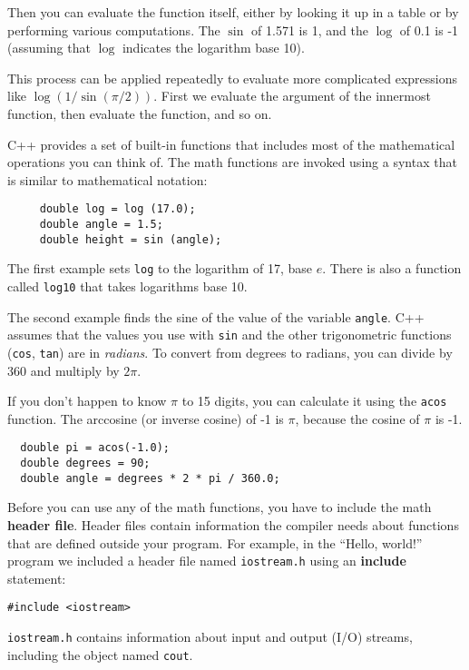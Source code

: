 Then you can evaluate the function itself, either by looking it up in
a table or by performing various computations.  The $\sin$ of 1.571 is
1, and the $\log$ of 0.1 is -1 (assuming that $\log$ indicates the
logarithm base 10).

This process can be applied repeatedly to evaluate more complicated
expressions like $\log(1/\sin(\pi/2))$.  First we evaluate the
argument of the innermost function, then evaluate the function,
and so on.

C++ provides a set of built-in functions that includes most
of the mathematical operations you can think of.
The math functions are invoked using a syntax that is similar to
mathematical notation:

\begin{verbatim}
     double log = log (17.0);
     double angle = 1.5;
     double height = sin (angle);
\end{verbatim}
%
The first example sets {\tt log} to the logarithm of 17, base
$e$.  There is also a function called {\tt log10} that takes
logarithms base 10.

The second example finds the sine of the value of the variable
{\tt angle}.  C++ assumes that the
values you use with {\tt sin} and the other trigonometric functions
({\tt cos}, {\tt tan}) are in {\em radians}.  To
convert from degrees to radians, you can divide by 360
and multiply by $2 \pi$.  

If you don't happen to know $\pi$ to 15 digits, you can
calculate it using the {\tt acos} function.  The arccosine
(or inverse cosine) of -1 is $\pi$, because the cosine of
$\pi$ is -1.

\begin{verbatim}
  double pi = acos(-1.0);
  double degrees = 90;
  double angle = degrees * 2 * pi / 360.0;
\end{verbatim}
%
Before you can use any of the math functions, you have to
include the math {\bf header file}.  Header files contain
information the compiler needs about functions that are defined
outside your program.  For example, in the ``Hello, world!''
program we included a header file named {\tt iostream.h} using
an {\bf include} statement:

\begin{verbatim}
#include <iostream>
\end{verbatim}
%
{\tt iostream.h} contains information about input and output
(I/O) streams, including the object named {\tt cout}.


